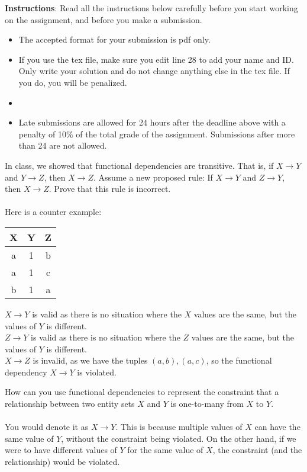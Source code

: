 \documentclass[a4 paper]{article}
\begin{document}
\textbf{Instructions}: Read all the instructions below carefully before you start working on the assignment, and before you make a submission.
\begin{itemize}
    \item The accepted format for your submission is pdf only.
    \item If you use the tex file, make sure you edit line 28 to add your name and ID. Only write your solution and do not change anything else in the tex file. If you do, you will be penalized.
    \item \item Late submissions are allowed for 24 hours after the deadline above with a penalty of 10\% of the total grade of the assignment. Submissions after more than 24 are not allowed.
\end{itemize}

In class, we showed that functional dependencies are transitive. That is, if $X \rightarrow Y$ and $Y \rightarrow Z$, then $X \rightarrow Z$. Assume a new proposed rule: If $X \rightarrow Y$ and $Z \rightarrow Y$, then $X \rightarrow Z$. Prove that this rule is incorrect.\\\\
Here is a counter example:
\begin{center}
  \begin{tabular}{|c|c|c|}
   \hline
    X & Y & Z\\ [0.5ex]
   \hline\hline
   a & 1 & b\\
   \hline
   a & 1 & c\\
   \hline
   b & 1 & a\\
   \hline
  \end{tabular}
\end{center}
$X\rightarrow Y$ is valid as there is no situation where the $X$ values are the same, but the values of $Y$ is different.\\
$Z\rightarrow Y$ is valid as there is no situation where the $Z$ values are the same, but the values of $Y$ is different.\\
$X\rightarrow Z$ is invalid, as we have the tuples $(a,b),(a,c)$, so the functional dependency $X\rightarrow Y$ is violated.



How can you use functional dependencies to represent the constraint that a relationship between two entity sets $X$ and $Y$ is one-to-many from $X$ to $Y$.\\\\
You would denote it as $X\rightarrow Y$. This is because multiple values of $X$ can have the same value of $Y$, without the constraint being violated. On the other hand, if we were to have different values of $Y$ for the same value of $X$, the constraint (and the relationship) would be violated.
\end{document}
